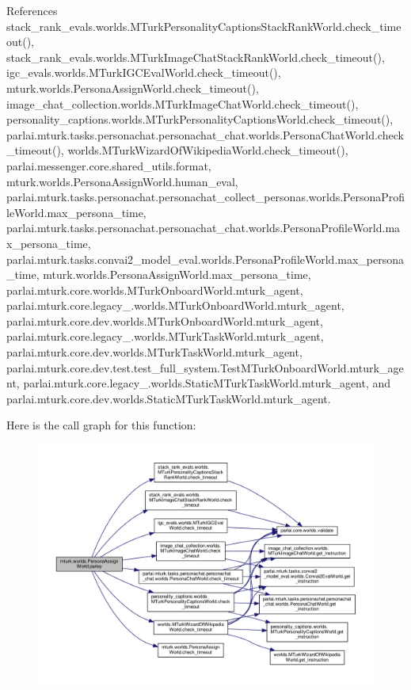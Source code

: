 References stack\+\_\+rank\+\_\+evals.\+worlds.\+M\+Turk\+Personality\+Captions\+Stack\+Rank\+World.\+check\+\_\+timeout(), stack\+\_\+rank\+\_\+evals.\+worlds.\+M\+Turk\+Image\+Chat\+Stack\+Rank\+World.\+check\+\_\+timeout(), igc\+\_\+evals.\+worlds.\+M\+Turk\+I\+G\+C\+Eval\+World.\+check\+\_\+timeout(), mturk.\+worlds.\+Persona\+Assign\+World.\+check\+\_\+timeout(), image\+\_\+chat\+\_\+collection.\+worlds.\+M\+Turk\+Image\+Chat\+World.\+check\+\_\+timeout(), personality\+\_\+captions.\+worlds.\+M\+Turk\+Personality\+Captions\+World.\+check\+\_\+timeout(), parlai.\+mturk.\+tasks.\+personachat.\+personachat\+\_\+chat.\+worlds.\+Persona\+Chat\+World.\+check\+\_\+timeout(), worlds.\+M\+Turk\+Wizard\+Of\+Wikipedia\+World.\+check\+\_\+timeout(), parlai.\+messenger.\+core.\+shared\+\_\+utils.\+format, mturk.\+worlds.\+Persona\+Assign\+World.\+human\+\_\+eval, parlai.\+mturk.\+tasks.\+personachat.\+personachat\+\_\+collect\+\_\+personas.\+worlds.\+Persona\+Profile\+World.\+max\+\_\+persona\+\_\+time, parlai.\+mturk.\+tasks.\+personachat.\+personachat\+\_\+chat.\+worlds.\+Persona\+Profile\+World.\+max\+\_\+persona\+\_\+time, parlai.\+mturk.\+tasks.\+convai2\+\_\+model\+\_\+eval.\+worlds.\+Persona\+Profile\+World.\+max\+\_\+persona\+\_\+time, mturk.\+worlds.\+Persona\+Assign\+World.\+max\+\_\+persona\+\_\+time, parlai.\+mturk.\+core.\+worlds.\+M\+Turk\+Onboard\+World.\+mturk\+\_\+agent, parlai.\+mturk.\+core.\+legacy\+\_.\+worlds.\+M\+Turk\+Onboard\+World.\+mturk\+\_\+agent, parlai.\+mturk.\+core.\+dev.\+worlds.\+M\+Turk\+Onboard\+World.\+mturk\+\_\+agent, parlai.\+mturk.\+core.\+legacy\+\_.\+worlds.\+M\+Turk\+Task\+World.\+mturk\+\_\+agent, parlai.\+mturk.\+core.\+dev.\+worlds.\+M\+Turk\+Task\+World.\+mturk\+\_\+agent, parlai.\+mturk.\+core.\+dev.\+test.\+test\+\_\+full\+\_\+system.\+Test\+M\+Turk\+Onboard\+World.\+mturk\+\_\+agent, parlai.\+mturk.\+core.\+legacy\+\_.\+worlds.\+Static\+M\+Turk\+Task\+World.\+mturk\+\_\+agent, and parlai.\+mturk.\+core.\+dev.\+worlds.\+Static\+M\+Turk\+Task\+World.\+mturk\+\_\+agent.

Here is the call graph for this function\+:
\nopagebreak
\begin{figure}[H]
\begin{center}
\leavevmode
\includegraphics[width=350pt]{classmturk_1_1worlds_1_1PersonaAssignWorld_a591fad7aeb3d2938543a669b0ac0dc15_cgraph}
\end{center}
\end{figure}


